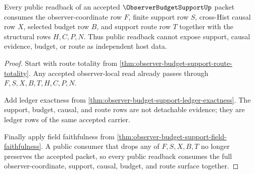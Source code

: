 \begin{theorem}
\label{thm:observer-budget-support-public-readback}
Every public readback of an accepted $\ObserverBudgetSupportUp$ packet consumes the observer-coordinate row $F$, finite support row $S$, cross-Hist causal row $X$, selected budget row $B$, and support route row $T$ together with the structural rows $H,C,P,N$. Thus public readback cannot expose support, causal evidence, budget, or route as independent host data.
\end{theorem}
\begin{proof}
Start with route totality from \autoref{thm:observer-budget-support-route-totality}. Any accepted observer-local read already passes through $F,S,X,B,T,H,C,P,N$.

Add ledger exactness from \autoref{thm:observer-budget-support-ledger-exactness}. The support, budget, causal, and route rows are not detachable evidence; they are ledger rows of the same accepted carrier.

Finally apply field faithfulness from \autoref{thm:observer-budget-support-field-faithfulness}. A public consumer that drops any of $F,S,X,B,T$ no longer preserves the accepted packet, so every public readback consumes the full observer-coordinate, support, causal, budget, and route surface together.
\end{proof}

